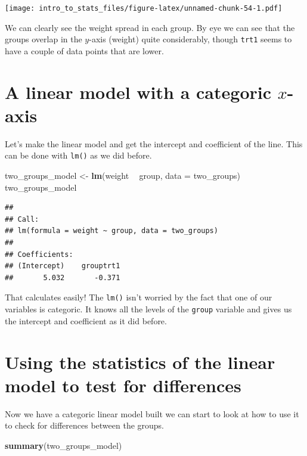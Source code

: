 \documentclass[
]{book}
\newenvironment{Shaded}{\begin{snugshade}}{\end{snugshade}}
\newcommand{\DataTypeTok}[1]{\textcolor[rgb]{0.13,0.29,0.53}{#1}}
\newcommand{\KeywordTok}[1]{\textcolor[rgb]{0.13,0.29,0.53}{\textbf{#1}}}
\newcommand{\NormalTok}[1]{#1}
\newcommand{\OperatorTok}[1]{\textcolor[rgb]{0.81,0.36,0.00}{\textbf{#1}}}
\newcommand{\StringTok}[1]{\textcolor[rgb]{0.31,0.60,0.02}{#1}}
\begin{document}
\texttt{[image: intro\_to\_stats\_files/figure-latex/unnamed-chunk-54-1.pdf]}

We can clearly see the weight spread in each group. By eye we can see that the groups overlap in the \(y\)-axis (weight) quite considerably, though \texttt{trt1} seems to have a couple of data points that are lower.

\hypertarget{a-linear-model-with-a-categoric-x-axis}{%
\section{\texorpdfstring{A linear model with a categoric \(x\)-axis}{A linear model with a categoric x-axis}}\label{a-linear-model-with-a-categoric-x-axis}}

Let's make the linear model and get the intercept and coefficient of the line. This can be done with \texttt{lm()} as we did before.

\begin{Shaded}
\begin{Highlighting}[]
\NormalTok{two_groups_model <-}\StringTok{ }\KeywordTok{lm}\NormalTok{(weight }\OperatorTok{~}\StringTok{ }\NormalTok{group, }\DataTypeTok{data =}\NormalTok{ two_groups)}
\NormalTok{two_groups_model}
\end{Highlighting}
\end{Shaded}

\begin{verbatim}
## 
## Call:
## lm(formula = weight ~ group, data = two_groups)
## 
## Coefficients:
## (Intercept)    grouptrt1  
##       5.032       -0.371
\end{verbatim}

That calculates easily! The \texttt{lm()} isn't worried by the fact that one of our variables is categoric. It knows all the levels of the \texttt{group} variable and gives us the intercept and coefficient as it did before.

\hypertarget{using-the-statistics-of-the-linear-model-to-test-for-differences}{%
\section{Using the statistics of the linear model to test for differences}\label{using-the-statistics-of-the-linear-model-to-test-for-differences}}

Now we have a categoric linear model built we can start to look at how to use it to check for differences between the groups.

\begin{Shaded}
\begin{Highlighting}[]
\KeywordTok{summary}\NormalTok{(two_groups_model)}
\end{Highlighting}
\end{Shaded}
\end{document}
